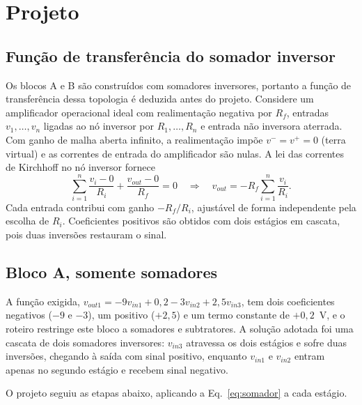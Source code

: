 \section{Projeto}
\label{sec:projeto}

\subsection{Função de transferência do somador inversor}
\label{sec:somador-prova}

Os blocos A e B são construídos com somadores inversores, portanto a
função de transferência dessa topologia é deduzida antes do projeto.
Considere um amplificador operacional ideal com realimentação negativa
por $R_f$, entradas $v_1,\dots,v_n$ ligadas ao nó inversor por
$R_1,\dots,R_n$ e entrada não inversora aterrada. Com ganho de malha
aberta infinito, a realimentação impõe $v^- = v^+ = 0$ (terra virtual)
e as correntes de entrada do amplificador são nulas.
A lei das correntes de Kirchhoff no nó inversor fornece
%
\begin{equation}
  \sum_{i=1}^{n}\frac{v_i - 0}{R_i} + \frac{v_{out} - 0}{R_f} = 0
  \quad\Longrightarrow\quad
  v_{out} = -R_f\sum_{i=1}^{n}\frac{v_i}{R_i}.
  \label{eq:somador}
\end{equation}
%
Cada entrada contribui com ganho $-R_f/R_i$, ajustável de forma
independente pela escolha de $R_i$. Coeficientes positivos são obtidos
com dois estágios em cascata, pois duas inversões restauram o sinal.

\subsection{Bloco A, somente somadores}

A função exigida,
$v_{out1} = -9v_{in1} + 0{,}2 - 3v_{in2} + 2{,}5v_{in3}$, tem dois
coeficientes negativos ($-9$ e $-3$), um positivo ($+2{,}5$) e um termo
constante de $+0{,}2$~V, e o roteiro restringe este bloco a somadores e
subtratores. A solução adotada foi uma cascata de dois somadores
inversores: $v_{in3}$ atravessa os dois estágios e sofre duas
inversões, chegando à saída com sinal positivo, enquanto $v_{in1}$ e
$v_{in2}$ entram apenas no segundo estágio e recebem sinal negativo.

O projeto seguiu as etapas abaixo, aplicando a
Eq.~\eqref{eq:somador} a cada estágio.

